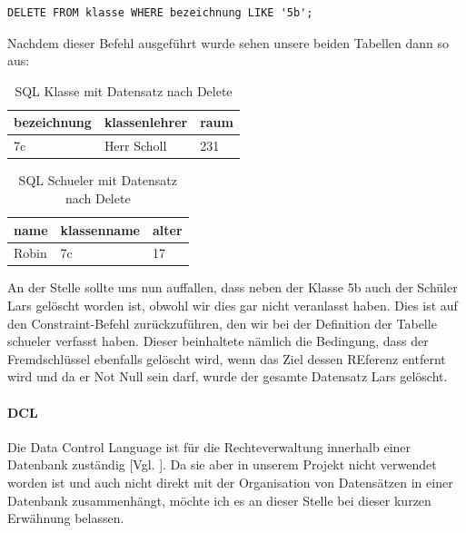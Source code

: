 \documentclass[12pt,a4paper,bibliography=totocnumbered,listof=totocnumbered]{scrartcl}
\begin{document}
\vspace{1em}
\begin{lstlisting}[caption= SQL Select Name + Where, label=lst:sql-select-name-where]
DELETE FROM klasse WHERE bezeichnung LIKE '5b';
\end{lstlisting}

Nachdem dieser Befehl ausgeführt wurde sehen unsere beiden Tabellen dann so aus:

\vspace{1em}
\begin{table}[!h]
	\centering
	\begin{tabular}{|l|l|l|}
		\hline
		\textbf{bezeichnung} & \textbf{klassenlehrer} & \textbf{raum}\\
		\hline
		7c & Herr Scholl & 231\\
		
	\end{tabular}
	\caption{SQL Klasse mit Datensatz nach Delete}
	\label{tab:sql-klasse3}
\end{table}

\vspace{1em}
\begin{table}[!h]
	\centering
	\begin{tabular}{|l|l|l|}
		\hline
		\textbf{name} & \textbf{klassenname} & \textbf{alter}\\
		\hline
		Robin & 7c & 17\\
		
	\end{tabular}
	\caption{SQL Schueler mit Datensatz nach Delete}
	\label{tab:sql-schueler4}
\end{table}

An der Stelle sollte uns nun auffallen, dass neben der Klasse 5b auch der Schüler Lars gelöscht worden ist, obwohl wir dies gar nicht veranlasst haben.
Dies ist auf den \glqq Constraint-Befehl\grqq{} zurückzuführen, den wir bei der Definition der Tabelle \glqq schueler\grqq{} verfasst haben.
Dieser beinhaltete nämlich die Bedingung, dass der Fremdschlüssel ebenfalls gelöscht wird, wenn das Ziel dessen REferenz entfernt wird und da er \glqq Not Null\grqq{} sein darf, wurde der gesamte Datensatz Lars gelöscht.

\paragraph{DCL} 
Die \glqq Data Control Language\grqq{} ist für die Rechteverwaltung innerhalb einer Datenbank zuständig [Vgl. \cite{wiki/SQL}].
Da sie aber in unserem Projekt nicht verwendet worden ist und auch nicht direkt mit der Organisation von Datensätzen in einer Datenbank zusammenhängt, möchte ich es an dieser Stelle bei dieser kurzen Erwähnung belassen.  
\end{document}
